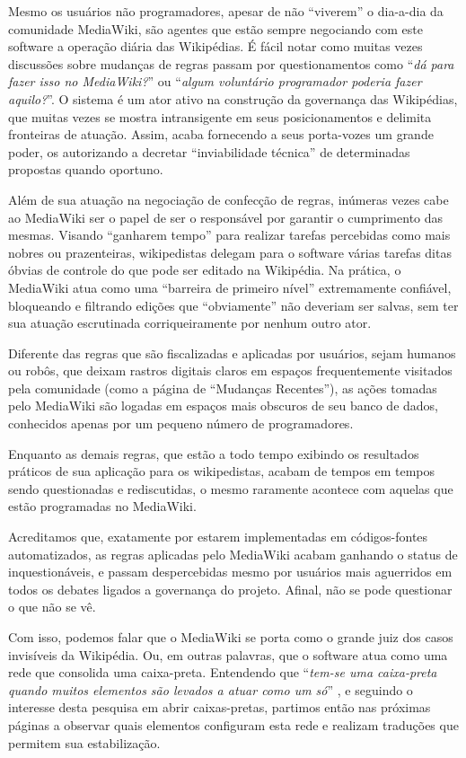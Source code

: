 Mesmo os usuários não programadores, apesar de não ``viverem'' o dia-a-dia da comunidade MediaWiki, são agentes que estão sempre negociando com este software a operação diária das Wikipédias. É fácil notar como muitas vezes discussões sobre mudanças de regras passam por questionamentos como ``\textit{dá para fazer isso no MediaWiki?}'' ou ``\textit{algum voluntário programador poderia fazer aquilo?}''. O sistema é um ator ativo na construção da governança das Wikipédias, que muitas vezes se mostra intransigente em seus posicionamentos e delimita fronteiras de atuação. Assim, acaba fornecendo a seus porta-vozes um grande poder, os autorizando a decretar ``inviabilidade técnica'' de determinadas propostas quando oportuno.

Além de sua atuação na negociação de confecção de regras, inúmeras vezes cabe ao MediaWiki ser o papel de ser o responsável por garantir o cumprimento das mesmas. Visando ``ganharem tempo'' para realizar tarefas percebidas como mais nobres ou prazenteiras, wikipedistas delegam para o software várias tarefas ditas óbvias de controle do que pode ser editado na Wikipédia. Na prática, o MediaWiki atua como uma ``barreira de primeiro nível'' extremamente confiável, bloqueando e filtrando edições que ``obviamente'' não deveriam ser salvas, sem ter sua atuação escrutinada corriqueiramente por nenhum outro ator.

Diferente das regras que são fiscalizadas e aplicadas por usuários, sejam humanos ou robôs, que deixam rastros digitais claros em espaços frequentemente visitados pela comunidade (como a página de ``Mudanças Recentes''), as ações tomadas pelo MediaWiki são logadas em espaços mais obscuros de seu banco de dados, conhecidos apenas por um pequeno número de programadores.

Enquanto as demais regras, que estão a todo tempo exibindo os resultados práticos de sua aplicação para os wikipedistas, acabam de tempos em tempos sendo questionadas e rediscutidas, o mesmo raramente acontece com aquelas que estão programadas no MediaWiki.

Acreditamos que, exatamente por estarem implementadas em códigos-fontes automatizados, as regras aplicadas pelo MediaWiki acabam ganhando o status de inquestionáveis, e passam despercebidas mesmo por usuários mais aguerridos em todos os debates ligados a governança do projeto. Afinal, não se pode questionar o que não se vê.

Com isso, podemos falar que o MediaWiki se porta como o grande juiz dos casos invisíveis da Wikipédia. Ou, em outras palavras, que o software atua como uma rede que consolida uma caixa-preta. Entendendo que ``\textit{tem-se uma caixa-preta quando muitos elementos são levados a atuar como um só}'' \citep[205]{latour_ciencia_1987}, e seguindo o interesse desta pesquisa em abrir caixas-pretas, partimos então nas próximas páginas a observar quais elementos configuram esta rede e realizam traduções que permitem sua estabilização.


